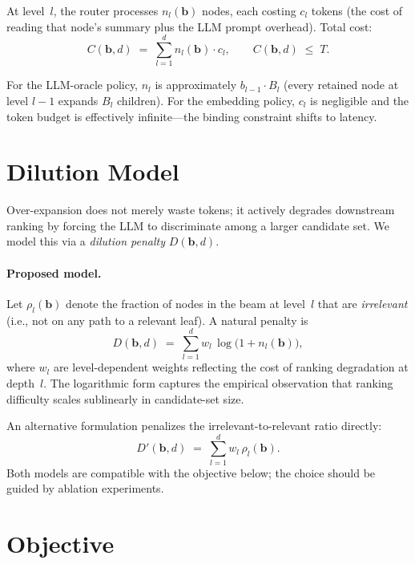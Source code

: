 \documentclass[11pt]{article}
\newcommand{\bvec}{\mathbf{b}}
\theoremstyle{plain}
\begin{document}
At level~$l$, the router processes $n_l(\bvec)$ nodes, each costing
$c_l$ tokens (the cost of reading that node's summary plus the LLM
prompt overhead).  Total cost:
\begin{equation}\label{eq:cost}
  C(\bvec, d) \;=\; \sum_{l=1}^{d} n_l(\bvec) \cdot c_l,
  \qquad
  C(\bvec, d) \;\leq\; T.
\end{equation}

For the LLM-oracle policy, $n_l$ is approximately $b_{l-1} \cdot B_l$
(every retained node at level $l{-}1$ expands $B_l$ children).
For the embedding policy, $c_l$ is negligible and the token budget is
effectively infinite---the binding constraint shifts to latency.

\section{Dilution Model}\label{sec:dilution}

Over-expansion does not merely waste tokens; it actively degrades
downstream ranking by forcing the LLM to discriminate among a larger
candidate set.  We model this via a \emph{dilution penalty}
$D(\bvec, d)$.

\paragraph{Proposed model.}
Let $\rho_l(\bvec)$ denote the fraction of nodes in the beam at
level~$l$ that are \emph{irrelevant} (i.e., not on any path to a
relevant leaf).  A natural penalty is
\begin{equation}\label{eq:dilution}
  D(\bvec, d)
  \;=\; \sum_{l=1}^{d}
    w_l \,\log\!\bigl(1 + n_l(\bvec)\bigr),
\end{equation}
where $w_l$ are level-dependent weights reflecting the cost of
ranking degradation at depth~$l$.  The logarithmic form captures the
empirical observation that ranking difficulty scales sublinearly in
candidate-set size.

An alternative formulation penalizes the irrelevant-to-relevant
ratio directly:
\[
  D'(\bvec, d)
  \;=\; \sum_{l=1}^{d} w_l \,\rho_l(\bvec).
\]
Both models are compatible with the objective below; the choice should
be guided by ablation experiments.

\section{Objective}
\end{document}
